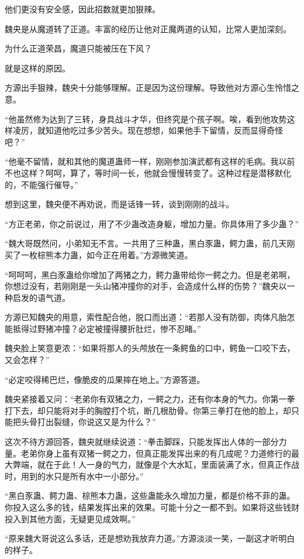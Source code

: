 \begin{this_body}
他们更没有安全感，因此招数就更加狠辣。

魏央是从魔道转了正道。丰富的经历让他对正魔两道的认知，比常人更加深刻。

为什么正道荣昌，魔道只能被压在下风？

就是这样的原因。

方源出手狠辣，魏央十分能够理解。正是因为这份理解。导致他对方源心生怜惜之意。

“他虽然修为达到了三转，身具战斗才华，但终究是个孩子啊。唉，看到他攻势这样凌厉，就知道他吃过多少苦头。现在想想，如果他手下留情，反而显得奇怪吧？”

“他毫不留情，就和其他的魔道蛊师一样，刚刚参加演武都有这样的毛病。我以前不也这样？呵呵，算了，等时间一长，他就会慢慢转变了。这种过程是潜移默化的，不能强行催导。”

想到这里，魏央便不再劝说，而是话锋一转，谈到刚刚的战斗。

“方正老弟，你之前说过，用了不少蛊改造身躯，增加力量。你具体用了多少蛊？”

“魏大哥既然问，小弟知无不言。一共用了三种蛊，黑白豕蛊，鳄力蛊，前几天刚买了一枚棕熊本力蛊，如今正在用着。”方源微笑道。

“呵呵呵，黑白豕蛊给你增加了两猪之力，鳄力蛊带给你一鳄之力。但是老弟啊，你想过没有，若刚刚是一头山猪冲撞你的对手，会造成什么样的伤势？”魏央以一种启发的语气道。

方源已知魏央的用意，索性配合他，脱口而出道：“若那人没有防御，肉体凡胎怎能抵得过野猪冲撞？必定被撞得腰折肚烂，惨不忍睹。”

魏央脸上笑意更浓：“如果将那人的头颅放在一条鳄鱼的口中，鳄鱼一口咬下去，又会怎样？”

“必定咬得稀巴烂，像脆皮的瓜果摔在地上。”方源答道。

魏央紧接着又问：“老弟你有双猪之力，一鳄之力，还有你本身的气力。你第一拳打下去，却只能将对手的胸膛打个坑，断几根肋骨。你第三拳打在他的脸上，却只能把头骨打出裂缝，你说这又是为什么？”

这次不待方源回答，魏央就继续说道：“拳击脚踩，只能发挥出人体的一部分力量。老弟你身上虽有双猪一鳄之力，但真正能发挥出来的有几成呢？力道修行的最大弊端，就在于此！人一身的气力，就像是个大水缸，里面装满了水，但真正作战时，用到的水只是所有水中一小部分。”

“黑白豕蛊、鳄力蛊、棕熊本力蛊，这些蛊能永久增加力量，都是价格不菲的蛊。你投入这么多的钱，结果发挥出来的效果。可能十分之一都不到。如果将这些钱财投入到其他方面，无疑更见成效啊。”

“原来魏大哥说这么多话，还是想劝我放弃力道。”方源淡淡一笑，一副这才听明白的样子。


\end{this_body}
